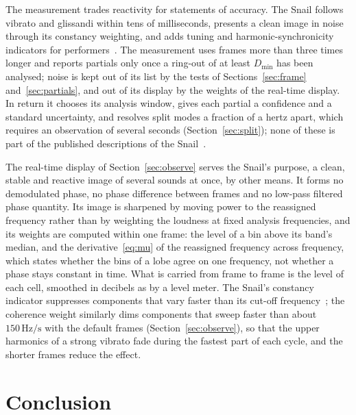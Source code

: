 \documentclass[10pt,a4paper,twocolumn]{article}
\newcommand{\Hz}{\,\mathrm{Hz}}
\begin{document}
The measurement trades reactivity for statements of accuracy. The Snail follows vibrato and glissandi within tens of milliseconds, presents a clean image in noise through its constancy weighting, and adds tuning and harmonic-synchronicity indicators for performers~\cite{HelieTimbre}. The measurement uses frames more than three times longer and reports partials only once a ring-out of at least $D_{\min}$ has been analysed; noise is kept out of its list by the tests of Sections~\ref{sec:frame} and~\ref{sec:partials}, and out of its display by the weights of the real-time display. In return it chooses its analysis window, gives each partial a confidence and a standard uncertainty, and resolves split modes a fraction of a hertz apart, which requires an observation of several seconds (Section~\ref{sec:split}); none of these is part of the published descriptions of the Snail~\cite{HelieSnail,HelieTimbre}.

The real-time display of Section~\ref{sec:observe} serves the Snail's purpose, a clean, stable and reactive image of several sounds at once, by other means. It forms no demodulated phase, no phase difference between frames and no low-pass filtered phase quantity. Its image is sharpened by moving power to the reassigned frequency rather than by weighting the loudness at fixed analysis frequencies, and its weights are computed within one frame: the level of a bin above its band's median, and the derivative~\eqref{eq:mu} of the reassigned frequency across frequency, which states whether the bins of a lobe agree on one frequency, not whether a phase stays constant in time. What is carried from frame to frame is the level of each cell, smoothed in decibels as by a level meter. The Snail's constancy indicator suppresses components that vary faster than its cut-off frequency~\cite{HelieTimbre}; the coherence weight similarly dims components that sweep faster than about $150\Hz/\mathrm{s}$ with the default frames (Section~\ref{sec:observe}), so that the upper harmonics of a strong vibrato fade during the fastest part of each cycle, and the shorter frames reduce the effect.

\section{Conclusion}
\end{document}
